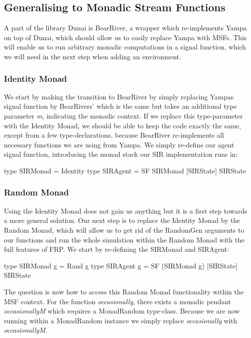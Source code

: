 \subsection{Generalising to Monadic Stream Functions}
\label{sec:generalising_msfs}
A part of the library Dunai is BearRiver, a wrapper which re-implements Yampa on top of Dunai, which should allow us to easily replace Yampa with MSFs. This will enable us to run arbitrary monadic computations in a signal function, which we will need in the next step when adding an environment.

\subsubsection{Identity Monad}
We start by making the transition to BearRiver by simply replacing Yampas signal function by BearRivers' which is the same but takes an additional type parameter \textit{m}, indicating the monadic context. If we replace this type-parameter with the Identity Monad, we should be able to keep the code exactly the same, except from a few type-declarations, because BearRiver re-implements all necessary functions we are using from Yampa. We simply re-define our agent signal function, introducing the monad stack our SIR implementation runs in:

\begin{HaskellCode}
type SIRMonad    = Identity
type SIRAgent    = SF SIRMonad [SIRState] SIRState
\end{HaskellCode}

\subsubsection{Random Monad}
Using the Identity Monad does not gain us anything but it is a first step towards a more general solution. Our next step is to replace the Identity Monad by the Random Monad, which will allow us to get rid of the RandomGen arguments to our functions and run the whole simulation within the Random Monad with the full features of FRP. We start by re-defining the SIRMonad and SIRAgent:

\begin{HaskellCode}
type SIRMonad g = Rand g
type SIRAgent g = SF (SIRMonad g) [SIRState] SIRState
\end{HaskellCode}

The question is now how to access this Random Monad functionality within the MSF context. For the function \textit{occasionally}, there exists a monadic pendant \textit{occasionallyM} which requires a MonadRandom type-class. Because we are now running within a MonadRandom instance we simply replace \textit{occasionally} with \textit{occasionallyM}. 

